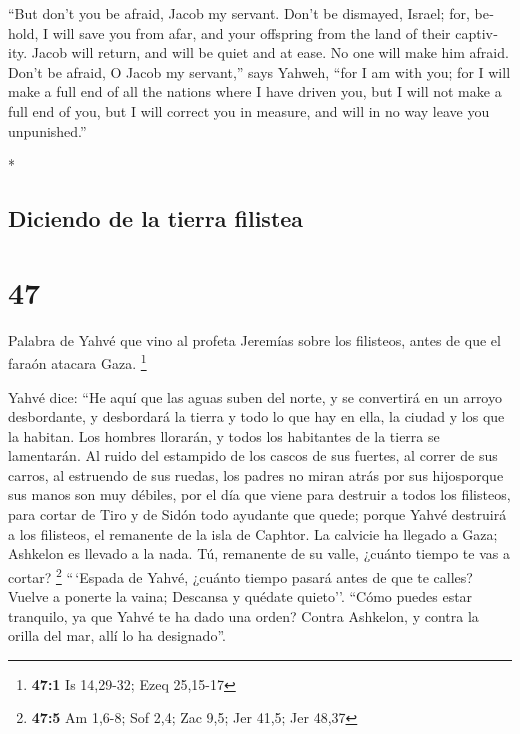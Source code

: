\begin{paracol}{2}
\begin{otherlanguage}{english}
 ``But don't you be afraid, Jacob my servant. Don't be
dismayed, Israel; for, behold, I will save you from afar, and your
offspring from the land of their captivity. Jacob will return, and will
be quiet and at ease. No one will make him afraid.  Don't
be afraid, O Jacob my servant,'' says Yahweh, ``for I am with you; for I
will make a full end of all the nations where I have driven you, but I
will not make a full end of you, but I will correct you in measure, and
will in no way leave you unpunished.''

\end{otherlanguage}

\switchcolumn[0]*

\hypertarget{diciendo-de-la-tierra-filistea}{%
\subsection{Diciendo de la tierra
filistea}\label{diciendo-de-la-tierra-filistea}}

\hypertarget{section-92}{%
\section{47}\label{section-92}}

 Palabra de Yahvé que vino al profeta Jeremías sobre los
filisteos, antes de que el faraón atacara Gaza. \footnote{\textbf{47:1}
  Is 14,29-32; Ezeq 25,15-17}

 Yahvé dice: ``He aquí que las aguas suben del norte, y se
convertirá en un arroyo desbordante, y desbordará la tierra y todo lo
que hay en ella, la ciudad y los que la habitan. Los hombres llorarán, y
todos los habitantes de la tierra se lamentarán.  Al ruido
del estampido de los cascos de sus fuertes, al correr de sus carros, al
estruendo de sus ruedas, los padres no miran atrás por sus hijosporque
sus manos son muy débiles,  por el día que viene para
destruir a todos los filisteos, para cortar de Tiro y de Sidón todo
ayudante que quede; porque Yahvé destruirá a los filisteos, el remanente
de la isla de Caphtor.  La calvicie ha llegado a Gaza;
Ashkelon es llevado a la nada. Tú, remanente de su valle, ¿cuánto tiempo
te vas a cortar? \footnote{\textbf{47:5} Am 1,6-8; Sof 2,4; Zac 9,5; Jer
  41,5; Jer 48,37}  ``\,`Espada de Yahvé, ¿cuánto tiempo
pasará antes de que te calles? Vuelve a ponerte la vaina; Descansa y
quédate quieto''.  ``Cómo puedes estar tranquilo, ya que
Yahvé te ha dado una orden? Contra Ashkelon, y contra la orilla del mar,
allí lo ha designado''.


\end{paracol}
